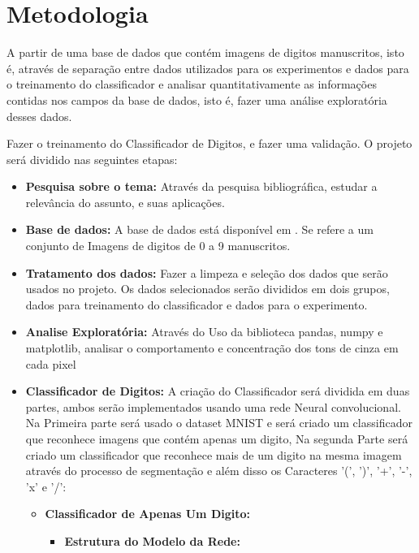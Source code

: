 \documentclass[conference]{IEEEtran}
\begin{document}
\section{Metodologia}

A partir de uma base de dados que contém imagens de digitos manuscritos, isto é, através de separação entre dados utilizados para os experimentos e dados para o treinamento do classificador e analisar quantitativamente as informações contidas nos campos da base de dados, isto é, fazer uma análise exploratória desses dados. 

Fazer o treinamento do Classificador de Digitos, e fazer uma validação. O projeto será dividido nas seguintes etapas:


\begin{itemize}
\item \textbf{Pesquisa sobre o tema:}
Através da pesquisa bibliográfica, estudar  a relevância do assunto, e suas aplicações.


\item \textbf{Base de dados:}
A base de dados está disponível em \cite{b1}. Se refere a um conjunto de Imagens de digitos de 0 a 9 manuscritos.


\item \textbf{Tratamento dos dados:}
Fazer a limpeza e seleção dos dados que serão usados no projeto. Os dados selecionados serão divididos em dois grupos, dados para treinamento do classificador e dados para o experimento.


\item \textbf{Analise Exploratória:}
Através do Uso da biblioteca pandas, numpy e matplotlib, analisar o comportamento e concentração dos tons de cinza em cada pixel

\item \textbf{Classificador de Digitos:}
	A criação do Classificador será dividida em duas partes, ambos serão implementados usando uma rede Neural  convolucional. Na Primeira parte será usado o dataset MNIST \cite{b1} e será criado um classificador que reconhece imagens que contém apenas um digito, Na segunda Parte será criado um classificador que reconhece mais de um digito na mesma imagem através do processo de segmentação e além disso os Caracteres '(', ')', '+', '-', 'x' e '/':
	
	
    \begin{itemize}
        \item \textbf{Classificador de Apenas Um Digito:}
        
        \begin{itemize}       
        \item \textbf{Estrutura do Modelo da Rede:}
        \end{itemize}
        

\end{itemize}
\end{itemize}
\end{document}

